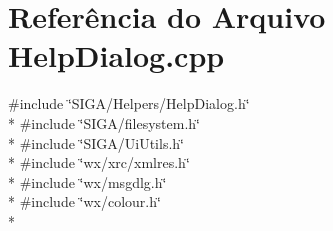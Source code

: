 \section{Referência do Arquivo Help\+Dialog.\+cpp}
\label{_help_dialog_8cpp}
{\ttfamily \#include \char`\"{}S\+I\+G\+A/\+Helpers/\+Help\+Dialog.\+h\char`\"{}}\\*
{\ttfamily \#include \char`\"{}S\+I\+G\+A/filesystem.\+h\char`\"{}}\\*
{\ttfamily \#include \char`\"{}S\+I\+G\+A/\+Ui\+Utils.\+h\char`\"{}}\\*
{\ttfamily \#include \char`\"{}wx/xrc/xmlres.\+h\char`\"{}}\\*
{\ttfamily \#include \char`\"{}wx/msgdlg.\+h\char`\"{}}\\*
{\ttfamily \#include \char`\"{}wx/colour.\+h\char`\"{}}\\*
